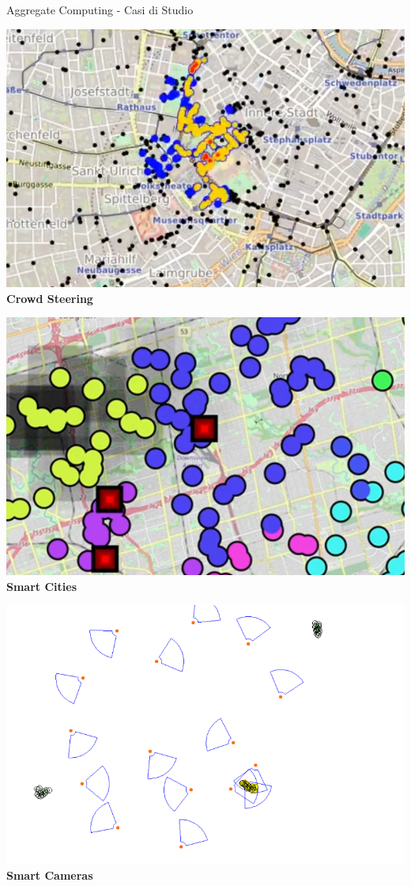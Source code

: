 \documentclass[presentation, 10pt,aspectratio=169]{beamer}\mode<presentation>{\usetheme{AMSBolognaFC}}
\begin{document}
\begin{frame}{Aggregate Computing - Casi di Studio}
	\begin{minipage}{0.32\textwidth}
		\includegraphics[width=\textwidth]{img/crowd-steering.png}
		\centering
		\textbf{Crowd Steering}
	\end{minipage}
	\hfill
	\begin{minipage}{0.32\textwidth}
		\includegraphics[width=\textwidth]{img/iot.png}
		\centering
		\textbf{Smart Cities}
	\end{minipage}
	\begin{minipage}{0.32\textwidth}
		\includegraphics[width=\textwidth]{img/smart-tracking.png}
		\centering
		\textbf{Smart Cameras}
	\end{minipage}
\end{frame}
\end{document}
